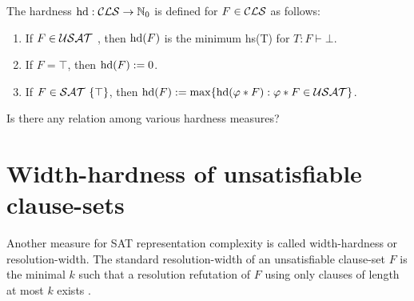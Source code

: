 \documentclass[12pt]{book}
\begin{document}
\begin{defi}\label{def:ex-hardness}
\cite{h11} The hardness $\operatorname{hd} : \mathcal{CLS} \rightarrow \mathbb{N}_0$ is defined for $F \in \mathcal{CLS}$ as follows:
\begin{enumerate}
  \item If $F \in \mathcal{USAT}$ , then $\operatorname{hd}(F)$ is the minimum hs(T) for $T : F \vdash \bot$.
  \item If $F = \top$, then $\operatorname{hd}(F) := 0$.
  \item If $F \in \mathcal{SAT} \ \{ \top \}$, then $\operatorname{hd}(F) := \max \{ \operatorname{hd}(\varphi * F) : \varphi * F \in \mathcal{USAT} \}$.
  \end{enumerate}
\end{defi}
\begin{quest}\label{que:hardness_measures}
      Is there any relation among various hardness measures?
\end{quest}
\section{Width-hardness of unsatisfiable clause-sets}
\label{sec:whdd}

Another measure for SAT representation complexity is called width-hardness or resolution-width. The standard resolution-width of an 
unsatisfiable clause-set $F$ is the minimal $k$ such that a resolution refutation of $F$ using only clauses of length at most $k$ exists \cite{h20}.
\end{document}
